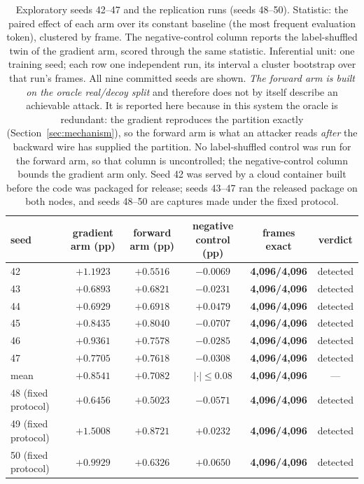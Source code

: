 \documentclass[11pt]{article}
\begin{document}
\begin{table}[H]
\centering\small
\begin{tabular}{@{}lccccc@{}}
\toprule
seed & gradient arm (pp) & forward arm (pp) & negative control (pp) & frames exact & verdict \\
\midrule
42 & $+1.1923$ & $+0.5516$ & $-0.0069$ & \textbf{4,096/4,096} & detected \\
43 & $+0.6893$ & $+0.6821$ & $-0.0231$ & \textbf{4,096/4,096} & detected \\
44 & $+0.6929$ & $+0.6918$ & $+0.0479$ & \textbf{4,096/4,096} & detected \\
45 & $+0.8435$ & $+0.8040$ & $-0.0707$ & \textbf{4,096/4,096} & detected \\
46 & $+0.9361$ & $+0.7578$ & $-0.0285$ & \textbf{4,096/4,096} & detected \\
47 & $+0.7705$ & $+0.7618$ & $-0.0308$ & \textbf{4,096/4,096} & detected \\
\midrule
mean & $+0.8541$ & $+0.7082$ & $|\cdot| \le 0.08$ & \textbf{4,096/4,096} & --- \\
\midrule
48 (fixed protocol) & $+0.6456$ & $+0.5023$ & $-0.0571$ & \textbf{4,096/4,096} & detected \\
49 (fixed protocol) & $+1.5008$ & $+0.8721$ & $+0.0232$ & \textbf{4,096/4,096} & detected \\
50 (fixed protocol) & $+0.9929$ & $+0.6326$ & $+0.0650$ & \textbf{4,096/4,096} & detected \\
\bottomrule
\end{tabular}


\caption{Exploratory seeds 42--47 and the replication runs (seeds
48--50). Statistic: the paired effect of each arm over its constant baseline
(the most frequent evaluation token), clustered by frame. The negative-control
column reports the label-shuffled twin of the gradient arm, scored through the
same statistic. Inferential unit: one training seed; each row one independent
run, its interval a cluster bootstrap over that run's frames. All nine
committed seeds are shown. \emph{The forward arm is built on the oracle
real/decoy split} and therefore does not by itself describe an achievable
attack. It is reported here because in this system the oracle is redundant:
the gradient reproduces the partition exactly (Section~\ref{sec:mechanism}), so
the forward arm is what an attacker reads \emph{after} the backward wire has
supplied the partition. No label-shuffled control was run for the forward arm,
so that column is uncontrolled; the negative-control column bounds the gradient
arm only. Seed 42 was served by a cloud container built before the code was
packaged for release; seeds 43--47 ran the released package on both nodes, and
seeds 48--50 are captures made under the fixed protocol.}
\label{tab:sixseed}
\end{table}
\end{document}
